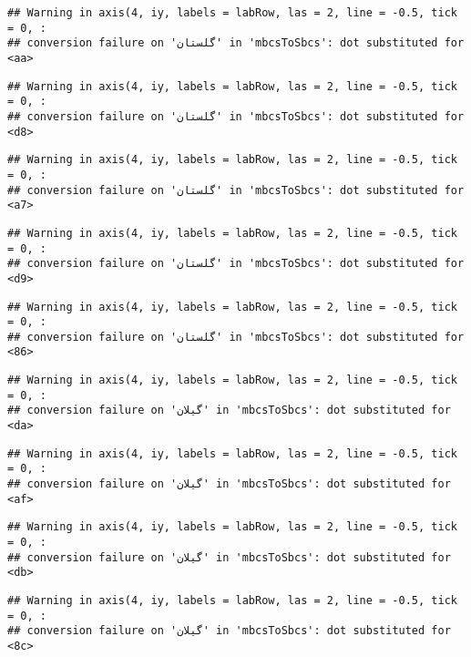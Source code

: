 \documentclass[
]{article}
\begin{document}
\begin{verbatim}
## Warning in axis(4, iy, labels = labRow, las = 2, line = -0.5, tick = 0, :
## conversion failure on 'گلستان' in 'mbcsToSbcs': dot substituted for <aa>
\end{verbatim}

\begin{verbatim}
## Warning in axis(4, iy, labels = labRow, las = 2, line = -0.5, tick = 0, :
## conversion failure on 'گلستان' in 'mbcsToSbcs': dot substituted for <d8>
\end{verbatim}

\begin{verbatim}
## Warning in axis(4, iy, labels = labRow, las = 2, line = -0.5, tick = 0, :
## conversion failure on 'گلستان' in 'mbcsToSbcs': dot substituted for <a7>
\end{verbatim}

\begin{verbatim}
## Warning in axis(4, iy, labels = labRow, las = 2, line = -0.5, tick = 0, :
## conversion failure on 'گلستان' in 'mbcsToSbcs': dot substituted for <d9>
\end{verbatim}

\begin{verbatim}
## Warning in axis(4, iy, labels = labRow, las = 2, line = -0.5, tick = 0, :
## conversion failure on 'گلستان' in 'mbcsToSbcs': dot substituted for <86>
\end{verbatim}

\begin{verbatim}
## Warning in axis(4, iy, labels = labRow, las = 2, line = -0.5, tick = 0, :
## conversion failure on 'گیلان' in 'mbcsToSbcs': dot substituted for <da>
\end{verbatim}

\begin{verbatim}
## Warning in axis(4, iy, labels = labRow, las = 2, line = -0.5, tick = 0, :
## conversion failure on 'گیلان' in 'mbcsToSbcs': dot substituted for <af>
\end{verbatim}

\begin{verbatim}
## Warning in axis(4, iy, labels = labRow, las = 2, line = -0.5, tick = 0, :
## conversion failure on 'گیلان' in 'mbcsToSbcs': dot substituted for <db>
\end{verbatim}

\begin{verbatim}
## Warning in axis(4, iy, labels = labRow, las = 2, line = -0.5, tick = 0, :
## conversion failure on 'گیلان' in 'mbcsToSbcs': dot substituted for <8c>
\end{verbatim}
\end{document}
